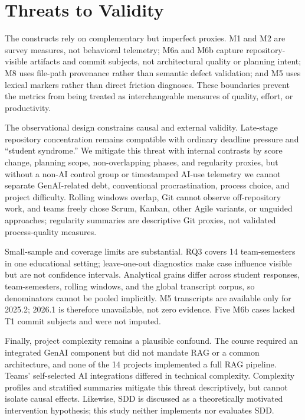 \section{Threats to Validity}
The constructs rely on complementary but imperfect proxies. M1 and M2 are
survey measures, not behavioral telemetry; M6a and M6b capture
repository-visible artifacts and commit subjects, not architectural quality or
planning intent; M8 uses file-path provenance rather than semantic defect
validation; and M5 uses lexical markers rather than direct friction diagnoses.
These boundaries prevent the metrics from being treated as interchangeable
measures of quality, effort, or productivity.

The observational design constrains causal and external validity. Late-stage
repository concentration remains compatible with ordinary deadline pressure
and ``student syndrome.'' We mitigate this threat with internal contrasts by
score change, planning scope, non-overlapping phases, and regularity proxies,
but without a non-AI control group or timestamped AI-use telemetry we cannot
separate GenAI-related debt, conventional procrastination, process choice, and
project difficulty. Rolling windows overlap, Git cannot observe off-repository
work, and teams freely chose Scrum, Kanban, other Agile variants, or unguided
approaches; regularity summaries are descriptive Git proxies, not validated
process-quality measures.

Small-sample and coverage limits are substantial. RQ3 covers 14
team-semesters in one educational setting; leave-one-out diagnostics make
case influence visible but are not confidence intervals. Analytical grains
differ across student responses, team-semesters, rolling windows, and the
global transcript corpus, so denominators cannot be pooled implicitly. M5
transcripts are available only for 2025.2; 2026.1 is therefore unavailable,
not zero evidence. Five M6b cases lacked T1 commit subjects and were not
imputed.

Finally, project complexity remains a plausible confound. The course required
an integrated GenAI component but did not mandate RAG or a common architecture,
and none of the 14 projects implemented a full RAG pipeline. Teams'
self-selected AI integrations differed in technical complexity. Complexity
profiles and stratified summaries mitigate this threat descriptively, but
cannot isolate causal effects. Likewise, SDD is discussed as a theoretically
motivated intervention hypothesis; this study neither implements nor evaluates
SDD.
